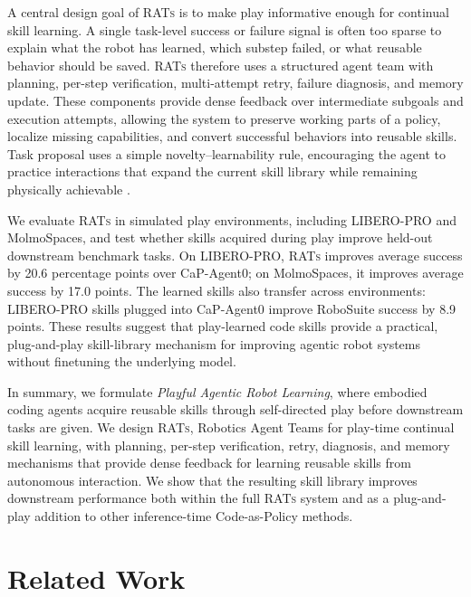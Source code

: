 \documentclass{llmxive}
\begin{document}
A central design goal of \textsc{RATs} is to make play informative enough for continual skill learning. A single task-level success or failure signal is often too sparse to explain what the robot has learned, which substep failed, or what reusable behavior should be saved. 
\textsc{RATs} therefore uses a structured agent team with planning, per-step verification, multi-attempt retry, failure diagnosis, and memory update. These components provide dense feedback over intermediate subgoals and execution attempts, allowing the system to preserve working parts of a policy, localize missing capabilities, and convert successful behaviors into reusable skills. Task proposal uses a simple novelty--learnability rule, encouraging the agent to practice interactions that expand the current skill library while remaining physically achievable \citep{oudeyer2007intrinsic, baranes2013active}.

We evaluate \textsc{RATs} in simulated play environments, including LIBERO-PRO and MolmoSpaces, and test whether skills acquired during play improve held-out downstream benchmark tasks. On LIBERO-PRO, \textsc{RATs} improves average success by 20.6 percentage points over CaP-Agent0; on MolmoSpaces, it improves average success by 17.0 points. The learned skills also transfer across environments: LIBERO-PRO skills plugged into CaP-Agent0 improve RoboSuite success by 8.9 points. These results suggest that play-learned code skills provide a practical, plug-and-play skill-library mechanism for improving agentic robot systems without finetuning the underlying model.

In summary, we formulate \emph{Playful Agentic Robot Learning}, where embodied coding agents acquire reusable skills through self-directed play before downstream tasks are given. We design \textsc{RATs}, Robotics Agent Teams for play-time continual skill learning, with planning, per-step verification, retry, diagnosis, and memory mechanisms that provide dense feedback for learning reusable skills from autonomous interaction. We show that the resulting skill library improves downstream performance both within the full \textsc{RATs} system and as a plug-and-play addition to other inference-time Code-as-Policy methods.







\section{Related Work}
\label{sec:related}
\end{document}
